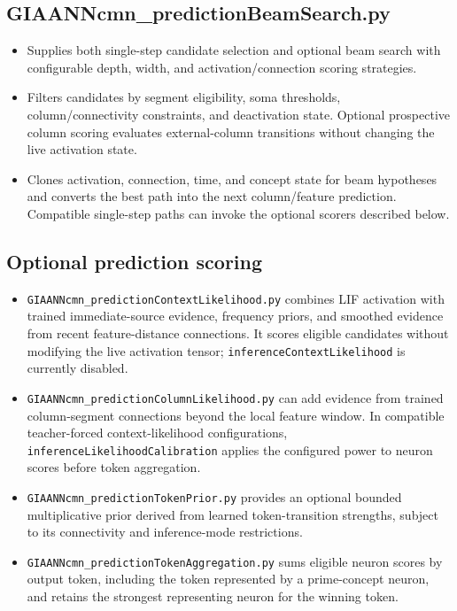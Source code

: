 \subsection{GIAANNcmn\_predictionBeamSearch.py}
\begin{itemize}
	\item Supplies both single-step candidate selection and optional beam search with configurable depth, width, and activation/connection scoring strategies.
	\item Filters candidates by segment eligibility, soma thresholds, column/connectivity constraints, and deactivation state. Optional prospective column scoring evaluates external-column transitions without changing the live activation state.
	\item Clones activation, connection, time, and concept state for beam hypotheses and converts the best path into the next column/feature prediction. Compatible single-step paths can invoke the optional scorers described below.
\end{itemize}

\subsection{Optional prediction scoring}
\begin{itemize}
	\item \texttt{GIAANNcmn\_predictionContextLikelihood.py} combines LIF activation with trained immediate-source evidence, frequency priors, and smoothed evidence from recent feature-distance connections. It scores eligible candidates without modifying the live activation tensor; \texttt{inferenceContextLikelihood} is currently disabled.
	\item \texttt{GIAANNcmn\_predictionColumnLikelihood.py} can add evidence from trained column-segment connections beyond the local feature window. In compatible teacher-forced context-likelihood configurations, \texttt{inferenceLikelihoodCalibration} applies the configured power to neuron scores before token aggregation.
	\item \texttt{GIAANNcmn\_predictionTokenPrior.py} provides an optional bounded multiplicative prior derived from learned token-transition strengths, subject to its connectivity and inference-mode restrictions.
	\item \texttt{GIAANNcmn\_predictionTokenAggregation.py} sums eligible neuron scores by output token, including the token represented by a prime-concept neuron, and retains the strongest representing neuron for the winning token.
\end{itemize}

